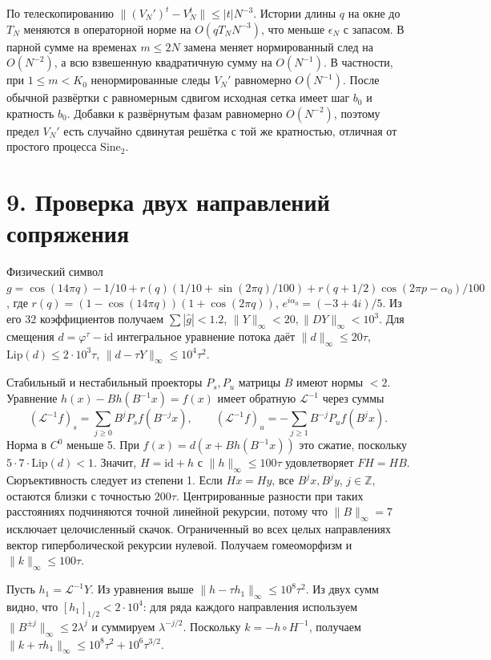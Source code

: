 \documentclass[11pt,a4paper]{article}
\newcommand{\Z}{\mathbb Z}
\newcommand{\sect}[1]{\section*{\sffamily\color{ink}#1}}
\begin{document}
По телескопированию \(\|(V_N')^t-V_N^t\|\le |t|N^{-3}\).
Истории длины \(q\) на окне до \(T_N\) меняются в операторной норме на \(O(qT_N N^{-3})\), что меньше \(\epsilon_N\) с запасом. В парной сумме на временах \(m\le2N\) замена меняет нормированный след на \(O(N^{-2})\), а всю взвешенную квадратичную сумму на \(O(N^{-1})\). В частности, при \(1\le m<K_0\) ненормированные следы \(V_N'\) равномерно \(O(N^{-1})\). После обычной развёртки с равномерным сдвигом исходная сетка имеет шаг \(b_0\) и кратность \(b_0\). Добавки к развёрнутым фазам равномерно \(O(N^{-2})\), поэтому предел \(V_N'\) есть случайно сдвинутая решётка с той же кратностью, отличная от простого процесса \(\mathrm{Sine}_2\).

\newpage
\sect{9. Проверка двух направлений сопряжения}
Физический символ \(g=\cos(14\pi q)-1/10+r(q)(1/10+\sin(2\pi q)/100)
+r(q+1/2)\cos(2\pi p-\alpha_0)/100\), где
\(r(q)=(1-\cos(14\pi q))(1+\cos(2\pi q))\), \(e^{i\alpha_0}=(-3+4i)/5\).
Из его 32 коэффициентов получаем \(\sum|\widehat g|<1.2\),
\(\|Y\|_\infty<20,\|DY\|_\infty<10^3\).
Для смещения \(d=\varphi^\tau-\mathrm{id}\) интегральное уравнение потока даёт
\(\|d\|_\infty\le20\tau\), \(\mathrm{Lip}(d)\le2\cdot10^3\tau\),
\(\|d-\tau Y\|_\infty\le10^4\tau^2\).

Стабильный и нестабильный проекторы \(P_s,P_u\) матрицы \(B\) имеют нормы \(<2\). Уравнение \(h(x)-B h(B^{-1}x)=f(x)\) имеет обратную \(\mathcal L^{-1}\) через суммы
\[
 (\mathcal L^{-1}f)_s=\sum_{j\ge0}B^jP_s f(B^{-j}x),\qquad
 (\mathcal L^{-1}f)_u=-\sum_{j\ge1}B^{-j}P_u f(B^j x).
\]
Норма в \(C^0\) меньше 5. При \(f(x)=d(x+B h(B^{-1}x))\) это сжатие, поскольку \(5\cdot7\cdot\mathrm{Lip}(d)<1\). Значит, \(H=\mathrm{id}+h\) с \(\|h\|_\infty\le100\tau\) удовлетворяет \(FH=HB\). Сюръективность следует из степени 1. Если \(H x=H y\), все \(B^j x,B^j y\), \(j\in\Z\), остаются близки с точностью \(200\tau\). Центрированные разности при таких расстояниях подчиняются точной линейной рекурсии, потому что \(\|B\|_\infty=7\) исключает целочисленный скачок. Ограниченный во всех целых направлениях вектор гиперболической рекурсии нулевой. Получаем гомеоморфизм и \(\|k\|_\infty\le100\tau\).

Пусть \(h_1=\mathcal L^{-1}Y\). Из уравнения выше
\(\|h-\tau h_1\|_\infty\le10^8\tau^2\). Из двух сумм видно, что
\([h_1]_{1/2}<2\cdot10^4\): для ряда каждого направления используем
\(\|B^{\pm j}\|_\infty\le 2\lambda^j\) и суммируем \(\lambda^{-j/2}\).
Поскольку \(k=-h\circ H^{-1}\), получаем
\(\|k+\tau h_1\|_\infty\le10^8\tau^2+10^6\tau^{3/2}\).
\end{document}

